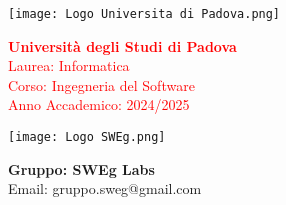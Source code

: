 \begin{minipage}{0.4\textwidth}
    \texttt{[image: Logo Universita di Padova.png]}
\end{minipage}
\begin{minipage}{0.55\textwidth}
    \textcolor{red}{\textbf{Università degli Studi di Padova}} \\
    \textcolor{red}{Laurea: Informatica} \\
    \textcolor{red}{Corso: Ingegneria del Software} \\
    \textcolor{red}{Anno Accademico: 2024/2025}
\end{minipage}

\begin{minipage}{0.4\textwidth}
    \texttt{[image: Logo SWEg.png]}
\end{minipage}
\begin{minipage}{0.55\textwidth}
    \textbf{Gruppo: SWEg Labs} \\
    Email: \textsf{gruppo.sweg@gmail.com}
\end{minipage}

\vspace{2cm}